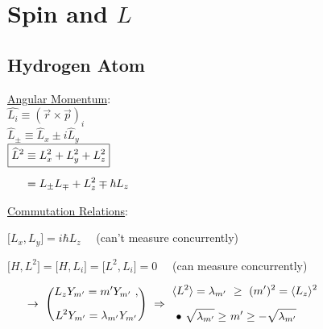 \documentclass[12pt]{article}
\begin{document}
\newpage
\section{Spin and \(L\)}
\subsection{Hydrogen Atom}

\noindent
\begin{minipage}[t]{.35\textwidth}
    \underline{Angular Momentum}:\\[10pt]
    \( \boxed{ \widehat{L_i} \equiv ( \vec{r} \times \vec{p} )_i } \)\\[5pt]
    \( \boxed{ \widehat{L}_{\pm} \equiv \widehat{L}_x \pm i \widehat{L}_y } \)\\[5pt]
    \( \begin{aligned}
        \Aboxed{ \widehat{L}^2 &\equiv L_x^2 + L_y^2 + L_z^2 } \\[5pt]   
        &= L_\pm L_\mp + L_z^2 \mp \hbar L_z
    \end{aligned} \)
\end{minipage}
\begin{minipage}[t]{.65\textwidth}
    \underline{Commutation Relations}:

    \vspace{10pt} \noindent \(
        \boxed{ \big[ L_x , L_y \big] = i \hbar L_z }
    \) \ \ {\scriptsize (can't measure concurrently)}

    \vspace{10pt} \noindent \(
        \boxed{ \big[ H , L^2 \big] = \big[ H , L_i \big] = \big[ L^2 , L_i \big] = 0}
    \) \ \ {\scriptsize (can measure concurrently)}

    \vspace{10pt} \noindent \( 
        \setlength{\parindent}{.5cm}
        \indent \rightarrow \ 
        \left( \begin{gathered}
            L_z Y_{m'} = m' Y_{m'} \ , \\[5pt]
            L^2 Y_{m'} = \lambda_{m'} Y_{m'}
        \end{gathered} \right)
        \ \Rightarrow \ 
        \begin{aligned}
            \langle L^2 \rangle = \lambda_{m'} \ &\geq \ (m')^2 = \langle L_z \rangle^2 \\[5pt]
            \bullet \ \sqrt{\lambda_{m'}} \geq \ &m' \geq -\sqrt{\lambda_{m'}}
        \end{aligned} 
    \)
\end{minipage}
\end{document}
